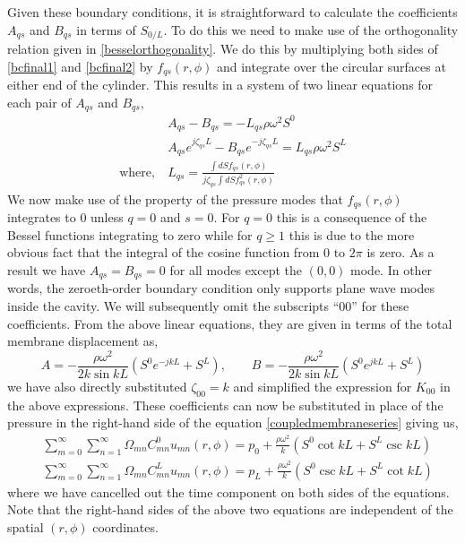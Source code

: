 Given these boundary conditions, it is straightforward to calculate the coefficients $A_{qs}$ and $B_{qs}$ in terms of $S_{0/L}$. To do this
we need to make use of the orthogonality relation given in \eqref{besselorthogonality}. We do this by multiplying both sides of \eqref{bcfinal1} and \eqref{bcfinal2}
by $f_{qs}(r,\phi)$ and integrate over the circular surfaces at either end of the cylinder. This results in a system of two linear equations for each pair of $A_{qs}$ 
and $B_{qs}$,
\begin{align}
 &A_{qs}-B_{qs} = -L_{qs}\rho\omega^2S^{0}\\
 &A_{qs}e^{j\zeta_{qs}L}-B_{qs}e^{-j\zeta_{qs}L} =  L_{qs}\rho\omega^2S^{L}\\
 \mbox{where,}\ &L_{qs} = \frac{\int dS f_{qs}(r,\phi)}{j\zeta_{qs}\int dS f^2_{qs}(r,\phi)}\nonumber
\end{align}
We now make use of the property of the pressure modes that $f_{qs}(r,\phi)$ integrates to $0$ unless $q=0$ and $s=0$. 
For $q=0$ this is a consequence of the Bessel functions integrating to zero while for $q\geq 1$ this is due to 
the more obvious fact that the integral of the cosine function from $0\mbox{ to }2\pi$ is zero. As a result we have $A_{qs}=B_{qs}=0$ for all
modes except the $(0,0)$ mode. In other words, the zeroeth-order boundary condition only supports plane wave
modes inside the cavity. We will subsequently omit the subscripts ``$00$'' for these coefficients.
From the above linear equations, they are given in terms of the total membrane displacement as,
\begin{equation}\label{finalpressurecoefficients}
 A=-\frac{\rho\omega^2}{2 k\sin kL}\left(S^0e^{-jkL}+S^L\right),\qquad  B=-\frac{\rho\omega^2}{2 k\sin kL}\left(S^0e^{jkL}+S^L\right)
\end{equation}
we have also directly substituted $\zeta_{00}=k$ and simplified the expression for $K_{00}$ in the above expressions. These
coefficients can now be substituted in place of the pressure in the right-hand side of the equation \eqref{coupledmembraneseries}
giving us,
\begin{align}
 &\displaystyle\sum^\infty_{m=0}\displaystyle\sum^\infty_{n=1}\Omega_{mn}C^{0}_{mn}u_{mn}(r,\phi)=p_{0}+\frac{\rho\omega^2}{k}\left(S^0\cot kL+S^L\csc kL\right)\\
 &\displaystyle\sum^\infty_{m=0}\displaystyle\sum^\infty_{n=1}\Omega_{mn}C^{L}_{mn}u_{mn}(r,\phi)=p_{L}+\frac{\rho\omega^2}{k}\left(S^0\csc kL+S^L\cot kL\right)
\end{align}
where we have cancelled out the time component on both sides of the equations. Note that the right-hand sides of the above two equations
are independent of the spatial $(r,\phi)$ coordinates.

